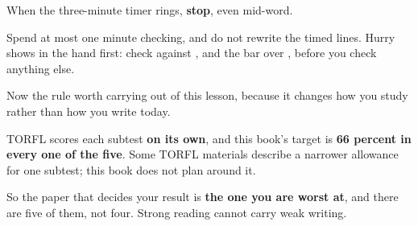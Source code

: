 When the three-minute timer rings, \textbf{stop}, even mid-word.

\begin{tcolorbox}[breakable,colback=teal!4,colframe=teal!35!black,title={Before you move on}]
Spend at most one minute checking, and do not rewrite the timed lines. Hurry shows in the hand first: check \textbf{} against \textbf{}, and the bar over \textbf{}, before you check anything else.

Now the rule worth carrying out of this lesson, because it changes how you study rather than how you write today.

TORFL scores each subtest \textbf{on its own}, and this book's target is \textbf{66 percent in every one of the five}. Some TORFL materials describe a narrower allowance for one subtest; this book does not plan around it.

So the paper that decides your result is \textbf{the one you are worst at}, and there are five of them, not four. Strong reading cannot carry weak writing.
\end{tcolorbox}
